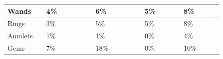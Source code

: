\begin{longtable}{|>{\RaggedRight}p{0.15554\linewidth}|>{\RaggedRight}p{0.19251\linewidth}|>{\RaggedRight}p{0.19844\linewidth}|>{\RaggedRight}p{0.15446\linewidth}|>{\RaggedRight}p{0.15619\linewidth}|}
\hspace*{0pt}\ignorespaces{}\hspace*{0pt}Wands\footnotemark[41]&\hspace*{0pt}\ignorespaces{}\hspace*{0pt}4\%&\hspace*{0pt}\ignorespaces{}\hspace*{0pt}6\%&\hspace*{0pt}\ignorespaces{}\hspace*{0pt}5\%&\hspace*{0pt}\ignorespaces{}\hspace*{0pt}8\%\\ \hline \hspace*{0pt}\ignorespaces{}\hspace*{0pt}Rings\footnotemark[42]&\hspace*{0pt}\ignorespaces{}\hspace*{0pt}3\%&\hspace*{0pt}\ignorespaces{}\hspace*{0pt}5\%&\hspace*{0pt}\ignorespaces{}\hspace*{0pt}5\%&\hspace*{0pt}\ignorespaces{}\hspace*{0pt}8\%\\ \hline \hspace*{0pt}\ignorespaces{}\hspace*{0pt}Amulets\footnotemark[43]&\hspace*{0pt}\ignorespaces{}\hspace*{0pt}1\%&\hspace*{0pt}\ignorespaces{}\hspace*{0pt}1\%&\hspace*{0pt}\ignorespaces{}\hspace*{0pt}0\%&\hspace*{0pt}\ignorespaces{}\hspace*{0pt}4\%\\ \hline \hspace*{0pt}\ignorespaces{}\hspace*{0pt}Gems\footnotemark[44]&\hspace*{0pt}\ignorespaces{}\hspace*{0pt}7\%&\hspace*{0pt}\ignorespaces{}\hspace*{0pt}18\%&\hspace*{0pt}\ignorespaces{}\hspace*{0pt}0\%&\hspace*{0pt}\ignorespaces{}\hspace*{0pt}10\%\\ \hline 
\end{longtable}
